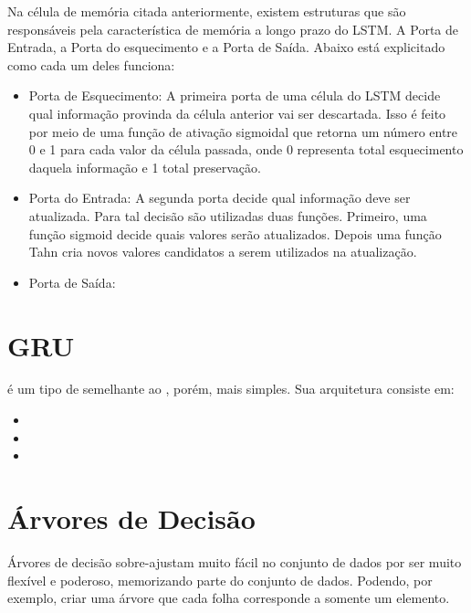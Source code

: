 Na célula de memória citada anteriormente, existem estruturas que são responsáveis pela característica de memória a longo prazo do \acrshort{LSTM}. A Porta de Entrada, a Porta do esquecimento e a Porta de Saída. Abaixo está explicitado como cada um deles funciona:

\begin{itemize}
  \item Porta de Esquecimento: A primeira porta de uma célula do \acrfull{LSTM} decide qual informação provinda da célula anterior vai ser descartada. Isso é feito por meio de uma função de ativação sigmoidal que retorna um número entre 0 e 1 para cada valor da célula passada, onde 0 representa total esquecimento daquela informação e 1 total preservação.
  
  \item Porta do Entrada: A segunda porta decide qual informação deve ser atualizada. Para tal decisão são utilizadas duas funções. Primeiro, uma função sigmoid decide quais valores serão atualizados. Depois uma função Tahn cria novos valores candidatos a serem utilizados na atualização.
  \item Porta de Saída:
\end{itemize}


\section{\acrfull{GRU}}

 é um tipo de  semelhante ao , porém, mais simples. Sua arquitetura consiste em:

\begin{itemize}
    \item 
    \item
    \item
\end{itemize}

\section{Árvores de Decisão}


Árvores de decisão sobre-ajustam muito fácil no conjunto de dados por ser muito flexível e poderoso, memorizando parte do conjunto de dados. Podendo, por exemplo, criar uma árvore que cada folha corresponde a somente um elemento.

